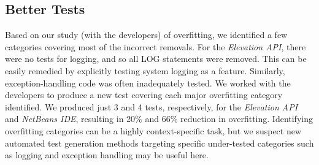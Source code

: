 \subsection{Better Tests} 
Based on our study (with the developers) of overfitting, we identified a few categories covering most of the incorrect removals. For the \textit{Elevation API}, there were no tests for logging, and so all LOG statements were removed. This can be easily remedied by explicitly testing system logging as a feature. Similarly, exception-handling code was often inadequately tested. We worked with the developers to produce a new test covering each major overfitting category identified. We produced just 3 and 4 tests, respectively, for the \textit{Elevation API} and \textit{NetBeans IDE}, resulting in 20\% and 66\% reduction in overfitting. Identifying overfitting categories can be a highly context-specific task, but we suspect new automated test generation methods targeting specific under-tested categories such as logging and exception handling may be useful here.






